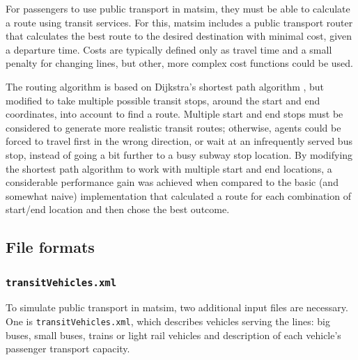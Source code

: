 For passengers to use public transport in \gls{matsim}, they must be able
to calculate a route using transit services. For this, \gls{matsim} includes a public
transport router that calculates the best route to the desired
destination with minimal cost, given a departure time. Costs are typically
defined only as travel time and a small penalty for changing lines, but other,
more complex cost functions could be used.

The routing algorithm is based on Dijkstra's shortest path algorithm
\citep{Dijkstra_NM_1959}, but modified to take
multiple possible transit stops, around the start and end coordinates,
into account to find a route. Multiple start and end stops must be considered
to generate more realistic transit routes; otherwise, agents could
be forced to travel first in the wrong direction, or wait at an infrequently
served bus stop, instead of going a bit further to a busy subway stop location.
By modifying the shortest path algorithm to work with multiple start and end
locations, a considerable performance gain was achieved when compared to the basic (and somewhat naive)
implementation that calculated a route for each combination of start/end location
and then chose the best outcome.
%

\subsection{File formats}

\subsubsection{\lstinline|transitVehicles.xml|}
\label{sec:inputdata:transitvehicles}



To simulate public transport in \gls{matsim}, two additional input files are necessary. One is \lstinline|transitVehicles.xml|, which describes vehicles serving the lines: big buses, small buses, trains or light rail vehicles and description of each vehicle's passenger transport capacity.

